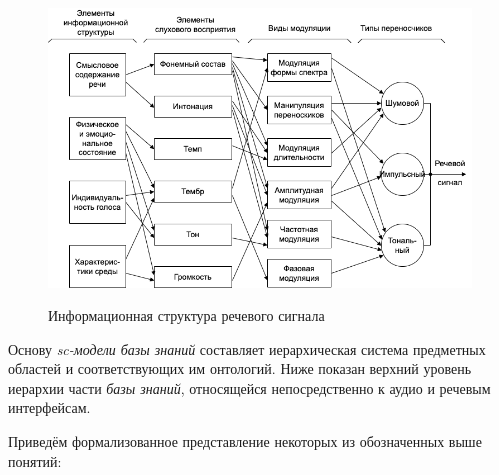 \begin{figure}[H]
    \caption{Информационная структура речевого сигнала \cite{Lobanov2006}}
        \includegraphics[scale=0.8, width=1.0\textwidth]{author/part4/figures/ch43_fig03_speech-signal-inf-structure-ru.png}
    \label{fig:speech-signal-inf-structure-ru}
\end{figure}

Основу \textit{sc-модели базы знаний} составляет иерархическая система предметных областей и соответствующих им онтологий. Ниже показан верхний уровень иерархии части \textit{базы знаний}, относящейся непосредственно к аудио и речевым интерфейсам.

Приведём формализованное представление некоторых из обозначенных выше понятий:

